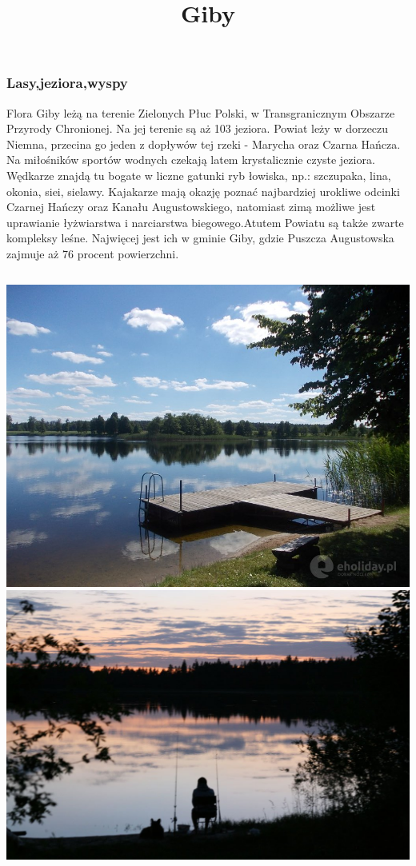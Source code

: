 \documentclass[]{beamer}
\title{Giby}
\date{}
\begin{document}
\frame
{
\maketitle
}

\frame
{
 \frametitle{Lasy,jeziora,wyspy}
 \begin{block}
 {Flora}
Giby leżą na terenie Zielonych Płuc Polski, w Transgranicznym Obszarze Przyrody Chronionej. Na jej terenie są aż 103 jeziora. Powiat leży w dorzeczu Niemna, przecina go jeden z dopływów tej rzeki - Marycha oraz Czarna Hańcza. Na miłośników sportów wodnych czekają latem krystalicznie czyste jeziora. Wędkarze znajdą tu bogate w liczne gatunki ryb łowiska, np.: szczupaka, lina, okonia, siei, sielawy. Kajakarze mają okazję poznać najbardziej urokliwe odcinki Czarnej Hańczy oraz Kanału Augustowskiego, natomiast zimą możliwe jest uprawianie łyżwiarstwa i narciarstwa biegowego.Atutem Powiatu są także zwarte kompleksy leśne. Najwięcej jest ich w gminie Giby, gdzie Puszcza Augustowska zajmuje aż 76 procent powierzchni. 
\end{block}}
\frame
{
\begin{columns}
\includegraphics[scale=0.15]{giby1.jpeg}
\includegraphics[scale=0.14]{giby2.jpg}
\end{columns}
}
\end{document}
